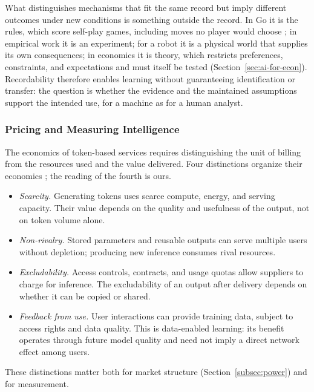 \documentclass[12pt]{article}
\theoremstyle{plain}
\theoremstyle{definition}
\theoremstyle{remark}
\begin{document}
What distinguishes mechanisms that fit the same record but imply
different outcomes under new conditions is something outside the
record. In Go it is the rules, which score self-play games, including
moves no player would choose \citep{Silver2017}; in empirical work it is
an experiment; for a robot it is a physical world that supplies its own
consequences; in economics it is theory, which restricts preferences,
constraints, and expectations and must itself be tested
(Section~\ref{sec:ai-for-econ}). Recordability therefore enables
learning without guaranteeing identification or transfer: the question
is whether the evidence and the maintained assumptions support the
intended use, for a machine as for a human analyst.

\subsubsection{Pricing and Measuring Intelligence}

The economics of token-based services requires distinguishing the unit
of billing from the resources used and the value delivered. Four
distinctions organize their economics
\citep[cf.][]{Hong2026TokenEcon}; the reading of the fourth is ours.
\begin{itemize}
  \item \emph{Scarcity.} Generating tokens uses scarce compute, energy,
    and serving capacity. Their value depends on the quality and
    usefulness of the output, not on token volume alone.
  \item \emph{Non-rivalry.} Stored parameters and reusable outputs can
    serve multiple users without depletion; producing new inference
    consumes rival resources.
  \item \emph{Excludability.} Access controls, contracts, and usage quotas
    allow suppliers to charge for inference. The excludability of an
    output after delivery depends on whether it can be copied or shared.
  \item \emph{Feedback from use.} User interactions can provide training
    data, subject to access rights and data quality. This is data-enabled
    learning: its benefit operates through future model quality and need
    not imply a direct network effect among users.
\end{itemize}
These distinctions matter both for market structure
(Section~\ref{subsec:power}) and for measurement.
\end{document}
